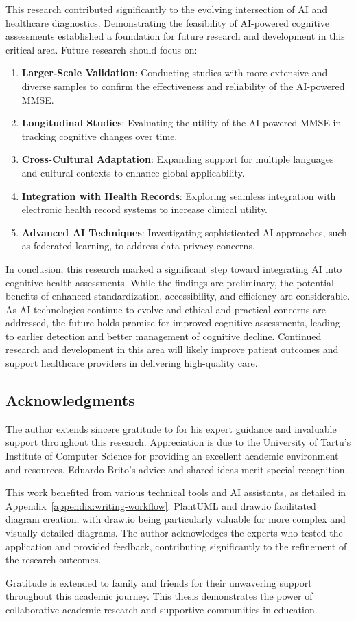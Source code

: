 This research contributed significantly to the evolving intersection of AI and healthcare diagnostics. Demonstrating the feasibility of AI-powered cognitive assessments established a foundation for future research and development in this critical area.
Future research should focus on:
\begin{enumerate}
\item \textbf{Larger-Scale Validation}: Conducting studies with more extensive and diverse samples to confirm the effectiveness and reliability of the AI-powered MMSE.
\item \textbf{Longitudinal Studies}: Evaluating the utility of the AI-powered MMSE in tracking cognitive changes over time.
\item \textbf{Cross-Cultural Adaptation}: Expanding support for multiple languages and cultural contexts to enhance global applicability.
\item \textbf{Integration with Health Records}: Exploring seamless integration with electronic health record systems to increase clinical utility.
\item \textbf{Advanced AI Techniques}: Investigating sophisticated AI approaches, such as federated learning, to address data privacy concerns.
\end{enumerate}
In conclusion, this research marked a significant step toward integrating AI into cognitive health assessments. While the findings are preliminary, the potential benefits of enhanced standardization, accessibility, and efficiency are considerable. As AI technologies continue to evolve and ethical and practical concerns are addressed, the future holds promise for improved cognitive assessments, leading to earlier detection and better management of cognitive decline. Continued research and development in this area will likely improve patient outcomes and support healthcare providers in delivering high-quality care.

\subsection*{Acknowledgments}
The author extends sincere gratitude to \supervisordr{} for his expert guidance and invaluable support throughout this research. Appreciation is due to the University of Tartu's Institute of Computer Science for providing an excellent academic environment and resources. Eduardo Brito's advice and shared ideas merit special recognition.

This work benefited from various technical tools and AI assistants, as detailed in Appendix~\ref{appendix:writing-workflow}. PlantUML and draw.io facilitated diagram creation, with draw.io being particularly valuable for more complex and visually detailed diagrams. The author acknowledges the experts who tested the application and provided feedback, contributing significantly to the refinement of the research outcomes.

Gratitude is extended to family and friends for their unwavering support throughout this academic journey. This thesis demonstrates the power of collaborative academic research and supportive communities in education.